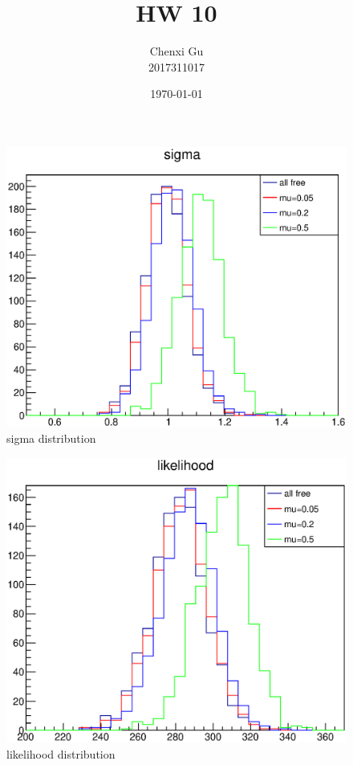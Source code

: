 \documentclass{article}
\begin{document}
\begin{CJK*}{GBK}{song}

\pagestyle{fancy}  
\fancyhead{} %
\renewcommand{\headrulewidth}{0.4pt}  
\renewcommand{\footrulewidth}{0.4pt} 



\title {HW 10}
\author{Chenxi Gu\\2017311017}

\date{\today}

\maketitle


\begin{figure}
\centering 
\includegraphics[width=1.2\textwidth]{sigma.eps}
\caption{sigma distribution} 
\end{figure}

\begin{figure}
\centering 
\includegraphics[width=1.2\textwidth]{likelihood.eps}
\caption{likelihood distribution} 
\end{figure}


\end{CJK*}
\end{document}
